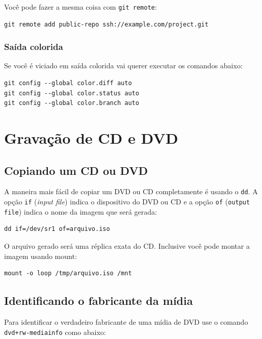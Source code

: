 \documentclass[12pt,brazil]{book}
\begin{document}
Você pode fazer a mesma coisa com \texttt{git remote}:

\begin{verbatim}
git remote add public-repo ssh://example.com/project.git
\end{verbatim}

\subsection{Saída colorida}
\label{sec:saida-colorida}

Se você é viciado em saída colorida vai querer executar os comandos abaixo:

\begin{verbatim}
git config --global color.diff auto
git config --global color.status auto
git config --global color.branch auto
\end{verbatim}

\chapter{Gravação de CD e DVD}
\label{cha:gravacao-de-cd}

\section{Copiando um CD ou DVD}
\label{sec:copiando-um-cd}

A maneira mais fácil de copiar um DVD ou CD completamente é usando o
\texttt{dd}. A opção \texttt{if} (\textit{input file}) indica o
dispositivo do DVD ou CD e a opção \texttt{of} (\texttt{output file})
indica o nome da imagem que será gerada:

\begin{verbatim}
dd if=/dev/sr1 of=arquivo.iso
\end{verbatim}

O arquivo gerado será uma réplica exata do CD. Inclusive você pode
montar a imagem usando mount:

\begin{verbatim}
mount -o loop /tmp/arquivo.iso /mnt
\end{verbatim}

\section{Identificando o fabricante da mídia}
\label{sec:ident-o-fabr}

Para identificar o verdadeiro fabricante de uma mídia de DVD use o
comando \texttt{dvd+rw-mediainfo} como abaixo:
\end{document}
